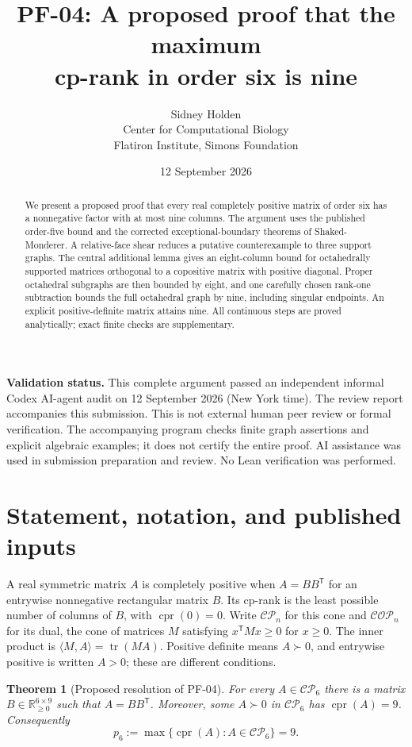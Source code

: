 \documentclass[11pt,a4paper]{article}
\title{\vspace{-12mm}\textbf{PF-04: A proposed proof that the maximum\protect\\ cp-rank in order six is nine}}
\author{Sidney Holden\\[3pt]\small Center for Computational Biology\\\small Flatiron Institute, Simons Foundation}
\date{12 September 2026}
\newtheorem{theorem}{Theorem}[section]
\theoremstyle{definition}
\newcommand{\CP}{\mathcal{CP}}
\newcommand{\COP}{\mathcal{COP}}
\newcommand{\R}{\mathbb{R}}
\DeclareMathOperator{\cpr}{cpr}
\DeclareMathOperator{\tr}{tr}
\newcommand{\ip}[2]{\langle #1,#2\rangle}
\newcommand{\T}{\mathsf T}
\begin{document}
\maketitle
\thispagestyle{empty}
\begin{abstract}
We present a proposed proof that every real completely positive matrix of order six has a nonnegative factor with at most nine columns. The argument uses the published order-five bound and the corrected exceptional-boundary theorems of Shaked-Monderer. A relative-face shear reduces a putative counterexample to three support graphs. The central additional lemma gives an eight-column bound for octahedrally supported matrices orthogonal to a copositive matrix with positive diagonal. Proper octahedral subgraphs are then bounded by eight, and one carefully chosen rank-one subtraction bounds the full octahedral graph by nine, including singular endpoints. An explicit positive-definite matrix attains nine. All continuous steps are proved analytically; exact finite checks are supplementary.
\end{abstract}
\noindent\textbf{Validation status.} This complete argument passed an independent informal Codex AI-agent audit on 12 September 2026 (New York time). The review report accompanies this submission. This is not external human peer review or formal verification. The accompanying program checks finite graph assertions and explicit algebraic examples; it does not certify the entire proof. AI assistance was used in submission preparation and review. No Lean verification was performed.

\section{Statement, notation, and published inputs}

A real symmetric matrix $A$ is completely positive when $A=BB^{\T}$ for an entrywise nonnegative rectangular matrix $B$. Its cp-rank is the least possible number of columns of $B$, with $\cpr(0)=0$. Write $\CP_n$ for this cone and $\COP_n$ for its dual, the cone of matrices $M$ satisfying $x^{\T}Mx\geq0$ for $x\geq0$. The inner product is $\ip{M}{A}=\tr(MA)$. Positive definite means $A\succ0$, and entrywise positive is written $A>0$; these are different conditions.

\begin{theorem}[Proposed resolution of PF-04]\label{thm:main}
For every $A\in\CP_6$ there is a matrix $B\in\R_{\geq0}^{6\times9}$ such that $A=BB^{\T}$. Moreover, some $A\succ0$ in $\CP_6$ has $\cpr(A)=9$. Consequently
\[
 p_6:=\max\{\cpr(A):A\in\CP_6\}=9.
\]
\end{theorem}
\end{document}
